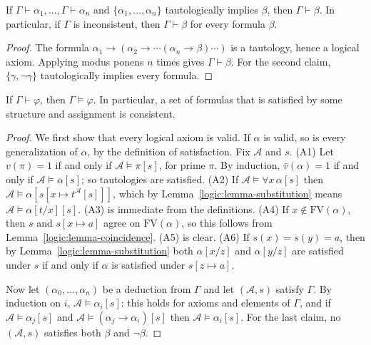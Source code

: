 \begin{lemma}[Rule T]\label{logic:lemma-rule-t}
If $\Gamma \vdash \alpha_1, \ldots, \Gamma \vdash \alpha_n$ and
$\{\alpha_1, \ldots, \alpha_n\}$ tautologically implies $\beta$, then
$\Gamma \vdash \beta$. In particular, if $\Gamma$ is inconsistent, then
$\Gamma \vdash \beta$ for every formula $\beta$.
\end{lemma}

\begin{proof}
The formula $\alpha_1 \to (\alpha_2 \to \cdots (\alpha_n \to \beta) \cdots)$ is a
tautology, hence a logical axiom. Applying modus ponens $n$ times gives
$\Gamma \vdash \beta$. For the second claim, $\{\gamma, \neg\gamma\}$
tautologically implies every formula.
\end{proof}

\begin{theorem}[Soundness]\label{logic:theorem-soundness}
If $\Gamma \vdash \varphi$, then $\Gamma \models \varphi$. In particular, a set
of formulas that is satisfied by some structure and assignment is consistent.
\end{theorem}

\begin{proof}
We first show that every logical axiom is valid. If $\alpha$ is valid, so is
every generalization of $\alpha$, by the definition of satisfaction. Fix
$\mathcal{A}$ and $s$.
(A1) Let $v(\pi) = 1$ if and only if $\mathcal{A} \models \pi[s]$, for prime
$\pi$. By induction, $\bar v(\alpha) = 1$ if and only if
$\mathcal{A} \models \alpha[s]$; so tautologies are satisfied.
(A2) If $\mathcal{A} \models \forall x\,\alpha[s]$ then
$\mathcal{A} \models \alpha[s[x \mapsto t^{\mathcal{A}}[s]]]$, which by
Lemma~\ref{logic:lemma-substitution} means $\mathcal{A} \models \alpha[t/x][s]$.
(A3) is immediate from the definitions.
(A4) If $x \notin \mathrm{FV}(\alpha)$, then $s$ and $s[x \mapsto a]$ agree on
$\mathrm{FV}(\alpha)$, so this follows from Lemma~\ref{logic:lemma-coincidence}.
(A5) is clear.
(A6) If $s(x) = s(y) = a$, then by Lemma~\ref{logic:lemma-substitution} both
$\alpha[x/z]$ and $\alpha[y/z]$ are satisfied under $s$ if and only if $\alpha$
is satisfied under $s[z \mapsto a]$.

Now let $(\alpha_0, \ldots, \alpha_n)$ be a deduction from $\Gamma$ and let
$(\mathcal{A}, s)$ satisfy $\Gamma$. By induction on $i$,
$\mathcal{A} \models \alpha_i[s]$: this holds for axioms and elements of
$\Gamma$, and if $\mathcal{A} \models \alpha_j[s]$ and
$\mathcal{A} \models (\alpha_j \to \alpha_i)[s]$ then
$\mathcal{A} \models \alpha_i[s]$. For the last claim, no $(\mathcal{A}, s)$
satisfies both $\beta$ and $\neg\beta$.
\end{proof}

